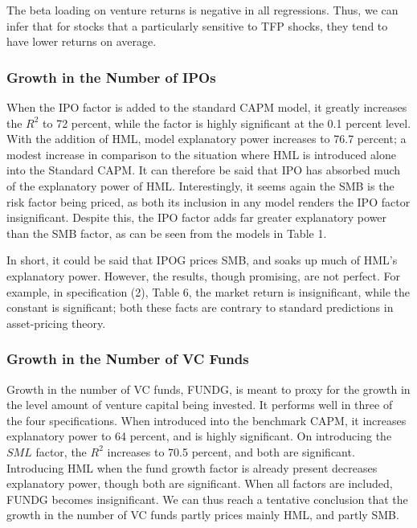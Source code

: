 \documentclass[12pt]{article}
\begin{document}
		The beta loading on venture returns is negative in all regressions. Thus, we can infer that for stocks that a particularly sensitive to TFP shocks, they tend to have lower returns on average.
 

	\subsubsection{Growth in the Number of IPOs}

	When the IPO factor is added to the standard CAPM model, it greatly increases the $R^2$ to 72 percent, while the factor is highly significant at the 0.1 percent level. With the addition of HML, model explanatory power increases to 76.7 percent; a modest increase in comparison to the situation where HML is introduced alone into the Standard CAPM. It can therefore be said that IPO has absorbed much of the explanatory power of HML. Interestingly, it seems again the SMB is the risk factor being priced, as both its inclusion in any model renders the IPO factor insignificant. Despite this, the IPO factor adds far greater explanatory power than the SMB factor, as can be seen from the models in Table 1.

	In short, it could be said that IPOG prices SMB, and soaks up much of HML's explanatory power. However, the results, though promising, are not perfect. For example, in specification (2), Table 6, the market return is insignificant, while the constant is significant; both these facts are contrary to standard predictions in asset-pricing theory.



	\subsubsection{Growth in the Number of VC Funds}

	Growth in the number of VC funds, FUNDG, is meant to proxy for the growth in the level amount of venture capital being invested. It performs well in three of the four specifications. When introduced into the benchmark CAPM, it increases explanatory power to 64 percent, and is highly significant. On introducing the $SML$ factor, the $R^2$ increases to 70.5 percent, and both are significant.  
Introducing HML when the fund growth factor is already present decreases explanatory power, though both are significant. When all factors are included, FUNDG becomes insignificant. We can thus reach a tentative conclusion that the growth in the number of VC funds partly prices mainly HML, and partly SMB.
\end{document}
